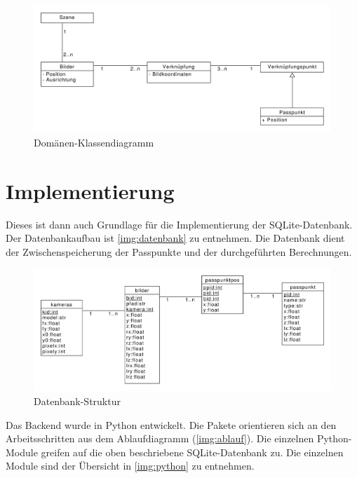\documentclass[a4paper,12pt,bibliography=totoc, listof=totoc,titlepage]{scrreprt}
\begin{document}
\begin{figure}[!htbp]
    \centering
    \includegraphics[width=1\textwidth]{./img/DomaenenKlassendiagramm.pdf}
    \centering
    \caption{Domänen-Klassendiagramm} %
    \label{img:dokladia} %
\end{figure}

\section{Implementierung}
\label{sec:Implementierung}
Dieses ist dann auch Grundlage für die Implementierung der SQLite-Datenbank. Der Datenbankaufbau ist \autoref{img:datenbank} zu entnehmen. Die Datenbank dient der Zwischenspeicherung der Passpunkte und der durchgeführten Berechnungen.

\begin{figure}[!htbp]
    \centering
    \includegraphics[width=1\textwidth]{./img/datenbank.pdf}
    \centering
    \caption{Datenbank-Struktur} %
    \label{img:datenbank} %
\end{figure}

Das Backend wurde in Python entwickelt. Die Pakete orientieren sich an den Arbeitsschritten aus dem Ablaufdiagramm (\autoref{img:ablauf}). Die einzelnen Python-Module greifen auf die oben beschriebene SQLite-Datenbank zu. Die einzelnen Module sind der Übersicht in \autoref{img:python} zu entnehmen.
\end{document}
